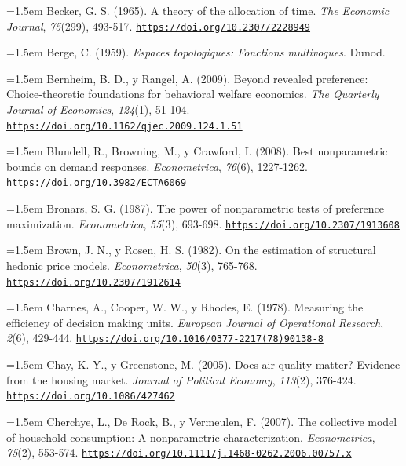 \documentclass[10pt,a4paper]{article}
\begin{document}
\noindent\hangindent=1.5em Becker, G. S. (1965). A theory of the allocation of time. \textit{The Economic Journal}, \textit{75}(299), 493-517. \href{https://doi.org/10.2307/2228949}{\nolinkurl{https://doi.org/10.2307/2228949}}

\noindent\hangindent=1.5em Berge, C. (1959). \textit{Espaces topologiques: Fonctions multivoques}. Dunod.

{\sloppy\noindent\hangindent=1.5em Bernheim, B. D., y Rangel, A. (2009). Beyond revealed preference: Choice-theoretic foundations for behavioral welfare economics. \textit{The Quarterly Journal of Economics}, \textit{124}(1), 51-104. \href{https://doi.org/10.1162/qjec.2009.124.1.51}{\nolinkurl{https://doi.org/10.1162/qjec.2009.124.1.51}}\par}

\noindent\hangindent=1.5em Blundell, R., Browning, M., y Crawford, I. (2008). Best nonparametric bounds on demand responses. \textit{Econometrica}, \textit{76}(6), 1227-1262. \href{https://doi.org/10.3982/ECTA6069}{\nolinkurl{https://doi.org/10.3982/ECTA6069}}

\noindent\hangindent=1.5em Bronars, S. G. (1987). The power of nonparametric tests of preference maximization. \textit{Econometrica}, \textit{55}(3), 693-698. \href{https://doi.org/10.2307/1913608}{\nolinkurl{https://doi.org/10.2307/1913608}}

\noindent\hangindent=1.5em Brown, J. N., y Rosen, H. S. (1982). On the estimation of structural hedonic price models. \textit{Econometrica}, \textit{50}(3), 765-768. \href{https://doi.org/10.2307/1912614}{\nolinkurl{https://doi.org/10.2307/1912614}}

{\sloppy\noindent\hangindent=1.5em Charnes, A., Cooper, W. W., y Rhodes, E. (1978). Measuring the efficiency of decision making units. \textit{European Journal of Operational Research}, \textit{2}(6), 429-444. \href{https://doi.org/10.1016/0377-2217(78)90138-8}{\nolinkurl{https://doi.org/10.1016/0377-2217(78)90138-8}}\par}

\noindent\hangindent=1.5em Chay, K. Y., y Greenstone, M. (2005). Does air quality matter? Evidence from the housing market. \textit{Journal of Political Economy}, \textit{113}(2), 376-424. \href{https://doi.org/10.1086/427462}{\nolinkurl{https://doi.org/10.1086/427462}}

{\sloppy\noindent\hangindent=1.5em Cherchye, L., De Rock, B., y Vermeulen, F. (2007). The collective model of household consumption: A nonparametric characterization. \textit{Econometrica}, \textit{75}(2), 553-574. \href{https://doi.org/10.1111/j.1468-0262.2006.00757.x}{\nolinkurl{https://doi.org/10.1111/j.1468-0262.2006.00757.x}}\par}
\end{document}
